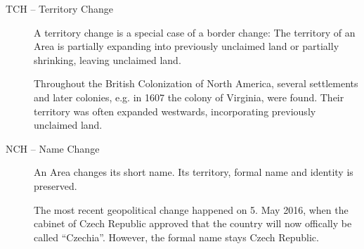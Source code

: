 \begin{description}
\begin{footnotesize}
  \end{footnotesize}
  \item[TCH -- Territory Change]
  A territory change is a special case of a border change: The territory of an Area is partially expanding into previously unclaimed land or partially shrinking, leaving unclaimed land. \\
  \begin{footnotesize}
    Throughout the British Colonization of North America, several settlements and later colonies, e.g. in 1607 the colony of Virginia, were found. Their territory was often expanded westwards, incorporating previously unclaimed land.
  \end{footnotesize}
  \item[NCH -- Name Change]
  An Area changes its short name. Its territory, formal name and identity is preserved. \\
  \begin{footnotesize}
    The most recent geopolitical change happened on 5. May 2016, when the cabinet of Czech Republic approved that the country will now offically be called ``Czechia''. However, the formal name stays Czech Republic.
  \end{footnotesize}
\end{description}

